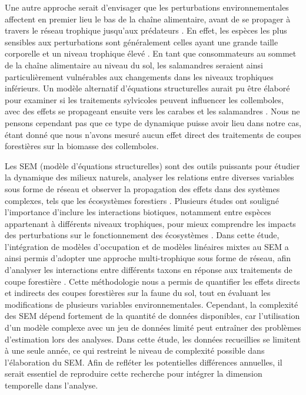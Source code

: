 Une autre approche serait d'envisager que les perturbations environnementales affectent en premier lieu le bas de la chaîne alimentaire, avant de se propager à travers le réseau trophique jusqu'aux prédateurs \citep{Laigle2021Directindirect}. 
En effet, les espèces les plus sensibles aux perturbations sont généralement celles ayant une grande taille corporelle et un niveau trophique élevé \citep{Seibold2015Associationextinction,Nolte2019Habitatspecialization,Hagge2021Whatdoes}. 
En tant que consommateurs au sommet de la chaîne alimentaire au niveau du sol, les salamandres seraient ainsi particulièrement vulnérables aux changements dans les niveaux trophiques inférieurs. 
Un modèle alternatif d'équations structurelles aurait pu être élaboré pour examiner si les traitements sylvicoles peuvent influencer les collemboles, avec des effets se propageant ensuite vers les carabes et les salamandres \citep{Laigle2021Directindirect}. 
Nous ne pensons cependant pas que ce type de dynamique puisse avoir lieu dans notre cas, étant donné que nous n'avons mesuré aucun effet direct des traitements de coupes forestières sur la biomasse des collemboles. 

Les SEM (modèle d’équations structurelles) sont des outils puissants pour étudier la dynamique des milieux naturels, analyser les relations entre diverses variables sous forme de réseau et observer la propagation des effets dans des systèmes complexes, 
tels que les écosystèmes forestiers \citep{graceSpecificationStructuralEquation2010}.  
Plusieurs études ont souligné l’importance d’inclure les interactions biotiques, notamment entre espèces appartenant à différents niveaux trophiques, pour mieux comprendre les impacts des perturbations 
sur le fonctionnement des écosystèmes \citep{Thebault2003Foodwebconstraints,Seibold2018necessitymultitrophic,Laigle2021Directindirect}.  
Dans cette étude, l’intégration de modèles d’occupation et de modèles linéaires mixtes au SEM a ainsi permis d’adopter une approche multi-trophique sous forme de réseau, 
afin d’analyser les interactions entre différents taxons en réponse aux traitements de coupe forestière \citep{josephIntegratingOccupancyModels2016}.  
Cette méthodologie nous a permis de quantifier les effets directs et indirects des coupes forestières sur la faune du sol, tout en évaluant les modifications de plusieurs variables environnementales. 
Cependant, la complexité des SEM dépend fortement de la quantité de données disponibles, car l’utilisation d’un modèle complexe avec un jeu de données limité peut entraîner des problèmes d’estimation lors des analyses.  
Dans cette étude, les données recueillies se limitent à une seule année, ce qui restreint le niveau de complexité possible dans l'élaboration du SEM. 
Afin de refléter les potentielles différences annuelles, il serait essentiel de reproduire cette recherche pour intégrer la dimension temporelle dans l’analyse.

